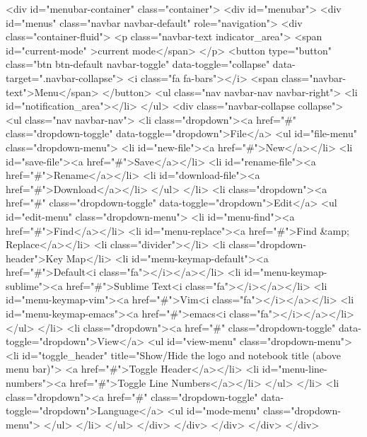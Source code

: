 <div id="menubar-container" class="container">
  <div id="menubar">
    <div id="menus" class="navbar navbar-default" role="navigation">
      <div class="container-fluid">
          <p  class="navbar-text indicator_area">
          <span id="current-mode" >current mode</span>
          </p>
        <button type="button" class="btn btn-default navbar-toggle" data-toggle="collapse" data-target=".navbar-collapse">
          <i class="fa fa-bars"></i>
          <span class="navbar-text">Menu</span>
        </button>
        <ul class="nav navbar-nav navbar-right">
          <li id="notification_area"></li>
        </ul>
        <div class="navbar-collapse collapse">
          <ul class="nav navbar-nav">
            <li class="dropdown"><a href="#" class="dropdown-toggle" data-toggle="dropdown">File</a>
              <ul id="file-menu" class="dropdown-menu">
                <li id="new-file"><a href="#">New</a></li>
                <li id="save-file"><a href="#">Save</a></li>
                <li id="rename-file"><a href="#">Rename</a></li>
                <li id="download-file"><a href="#">Download</a></li>
              </ul>
            </li>
            <li class="dropdown"><a href="#" class="dropdown-toggle" data-toggle="dropdown">Edit</a>
              <ul id="edit-menu" class="dropdown-menu">
                <li id="menu-find"><a href="#">Find</a></li>
                <li id="menu-replace"><a href="#">Find &amp; Replace</a></li>
                <li class="divider"></li>
                <li class="dropdown-header">Key Map</li>
                <li id="menu-keymap-default"><a href="#">Default<i class="fa"></i></a></li>
                <li id="menu-keymap-sublime"><a href="#">Sublime Text<i class="fa"></i></a></li>
                <li id="menu-keymap-vim"><a href="#">Vim<i class="fa"></i></a></li>
                <li id="menu-keymap-emacs"><a href="#">emacs<i class="fa"></i></a></li>
              </ul>
            </li>
            <li class="dropdown"><a href="#" class="dropdown-toggle" data-toggle="dropdown">View</a>
              <ul id="view-menu" class="dropdown-menu">
              <li id="toggle_header" title="Show/Hide the logo and notebook title (above menu bar)">
              <a href="#">Toggle Header</a></li>
              <li id="menu-line-numbers"><a href="#">Toggle Line Numbers</a></li>
              </ul>
            </li>
            <li class="dropdown"><a href="#" class="dropdown-toggle" data-toggle="dropdown">Language</a>
              <ul id="mode-menu" class="dropdown-menu">
              </ul>
            </li>
          </ul>
        </div>
      </div>
    </div>
  </div>
</div>

